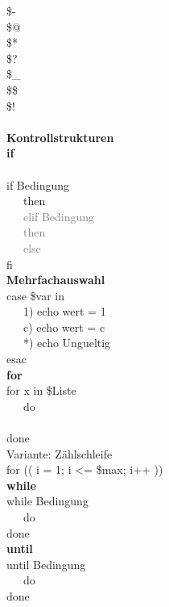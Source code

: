 \begin{tabbing}
\> \$- \> \\
\> \$@ \> \\
\> \$*  \> \\
\> \$? \> \\

\> \$\_ \> \\

\> \$\$ \> \\

\> \$! \> \\

\\
\textbf{Kontrollstrukturen}\\
\textbf{if}\\
\> \\
\> if Bedingung     \> \\

\> ~~~then\\

\> \textcolor{gray}{~~~elif Bedingung}\\
\> \textcolor{gray}{~~~then}\\

\> \textcolor{gray}{~~~else } \\

\> fi\\

\textbf{Mehrfachauswahl}\\
\> case \$var in\\
\> ~~~1) echo wert = 1\\
\> ~~~c) echo wert = c\\
\> ~~~*) echo Ungueltig\\
\> esac \\

\textbf{for}\\
\> for x in \$Liste \> \\

\> ~~~do \\\\
   
\> done \\

Variante: Zählschleife\\
\> for (( i = 1; i <= \$max; i++ ))\\

\textbf{while}\\
\> while  Bedingung\\

\> ~~~do \\
  
\> done\\
\textbf{until}\\
\> until Bedingung\\

\> ~~~do \\

\> done

\end{tabbing}